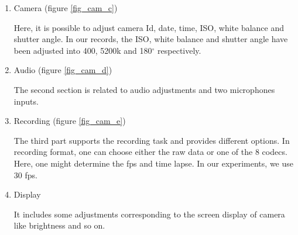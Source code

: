 \documentclass[[12pt,DIV14,BCOR12mm,a4paper,footexclude,headinclude,halfparskip-,twoside,openright,cleardoubleempty,idxtotoc,bibtotoc]{article}
\begin{document}
\begin{enumerate}

	\item Camera (figure \ref{fig_cam_c})

	Here, it is possible to adjust camera Id, date, time, ISO, white balance and shutter angle. In our records, the ISO, white balance and shutter angle have been adjusted into 400, 5200k and 180$^{\circ}$ respectively.

	\item Audio (figure \ref{fig_cam_d})

	The second section is related to audio adjustments and two microphones inputs.

	\item Recording (figure \ref{fig_cam_e})

	The third part supports the recording task and provides different options. In recording format, one can choose either the raw data or one of the 8 codecs. Here, one might determine the fps and time lapse. In our experiments, we use 30 fps.	

	\item Display

	It includes some adjustments corresponding to the screen display of camera like brightness and so on.


\end{enumerate}
\end{document}
